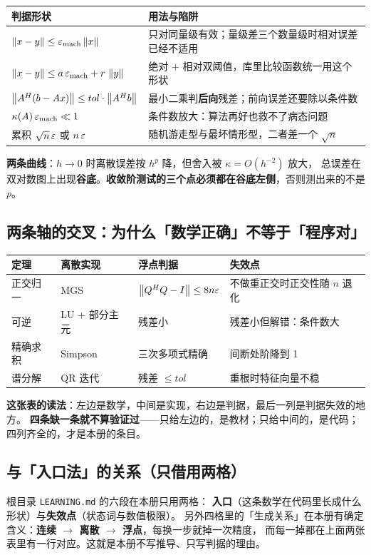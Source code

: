 \begin{center}
\begin{tabular}{L{4.6cm}L{9.8cm}}
\toprule
判据形状 & 用法与陷阱 \\
\midrule
$\left\lVert x-y\right\rVert\le \varepsilon_{\text{mach}}\left\lVert x\right\rVert$ & 只对同量级有效；量级差三个数量级时相对误差已经不适用 \\
$\left\lVert x-y\right\rVert\le a\,\varepsilon_{\text{mach}}+r\,\left\lVert y\right\rVert$ & 绝对 + 相对双阈值，库里比较函数统一用这个形状 \\
$\left\lVert A^{H}(b-Ax)\right\rVert\le tol\cdot\left\lVert A^{H}b\right\rVert$ & 最小二乘判\textbf{后向}残差；前向误差还要除以条件数 \\
$\kappa(A)\,\varepsilon_{\text{mach}}\ll 1$ & 条件数放大：算法再好也救不了病态问题 \\
累积 $\sqrt{n}\,\varepsilon$ 或 $n\,\varepsilon$ & 随机游走型与最坏情形型，二者差一个 $\sqrt n$ \\
\bottomrule
\end{tabular}
\end{center}

\noindent\textbf{两条曲线}：$h\to0$ 时离散误差按 $h^{p}$ 降，但舍入被 $\kappa=O(h^{-2})$ 放大，
总误差在双对数图上出现\textbf{谷底}。\textbf{收敛阶测试的三个点必须都在谷底左侧}，否则测出来的不是 $p$。

\subsection{两条轴的交叉：为什么「数学正确」不等于「程序对」}

\begin{center}
\begin{tabular}{L{2.8cm}L{3.0cm}L{4.6cm}L{3.8cm}}
\toprule
定理 & 离散实现 & 浮点判据 & 失效点 \\
\midrule
正交归一 & MGS & $\left\lVert Q^{H}Q-I\right\rVert\le 8n\varepsilon$ & 不做重正交时正交性随 $n$ 退化 \\
可逆 & LU + 部分主元 & 残差小 & 残差小但解错：条件数大 \\
精确求积 & Simpson & 三次多项式精确 & 间断处阶降到 1 \\
谱分解 & QR 迭代 & 残差 $\le tol$ & 重根时特征向量不稳 \\
\bottomrule
\end{tabular}
\end{center}

\noindent\textbf{这张表的读法}：左边是数学，中间是实现，右边是判据，最后一列是判据失效的地方。
\textbf{四条缺一条就不算验证过}——只给左边的，是教材；只给中间的，是代码；四列齐全的，才是本册的条目。

\subsection{与「入口法」的关系（只借用两格）}

根目录 \texttt{LEARNING.md} 的六段在本册只用两格：
\textbf{入口}（这条数学在代码里长成什么形状）与\textbf{失效点}（状态词与数值极限）。
另外四格里的「生成关系」在本册有确定含义：\textbf{连续 $\to$ 离散 $\to$ 浮点}，每换一步就掉一次精度，
而每一掉都在上面两张表里有一行对应。这就是本册不写推导、只写判据的理由。
